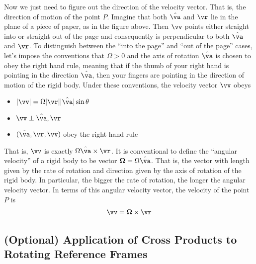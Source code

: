 Now we just need to figure out the direction
of the velocity vector. That is, the direction of motion of the point $P$.
Imagine that both $\hat\va$ and $\vr$ lie in the plane of a piece of paper, 
as in the figure above. Then $\vv$ points either straight into 
or straight out of the page and consequently is perpendicular
to both $\hat\va$ and $\vr$. To distinguish between the ``into the page''
and ``out of the page'' cases, let's impose the conventions that 
$\Omega>0$ and the axis of rotation $\hat\va$ is chosen to obey the right hand
 rule, meaning that if the thumb of
your right hand is pointing in the direction $\hat\va$, then your fingers
are pointing in the direction of motion of the rigid body.  Under these
conventions, the velocity vector $\vv$ obeys
\begin{itemize}
\item $|\vv|=\Omega|\vr||\hat\va|\sin\theta$
\item $\vv\perp\hat\va,\vr$
\item $(\hat\va,\vr,\vv)$ obey the right hand rule
\end{itemize}
That is, $\vv$ is exactly $\Omega\hat\va\times\vr$. It is conventional
to define the ``angular velocity'' of a rigid body to be vector
$\mathbf{\Omega}=\Omega\hat\va$. That is, the vector with length given 
by the rate of rotation and direction given by the axis of rotation 
of the rigid body. In particular, the bigger the rate of rotation, the longer
the angular velocity vector. In terms of this angular 
velocity vector, the velocity of the point $P$ is
\begin{align*}
\vv=\mathbf{\Omega}\times\vr
\end{align*}

\subsection{(Optional) Application of Cross Products to Rotating Reference Frames}\label{sec rot frame}

